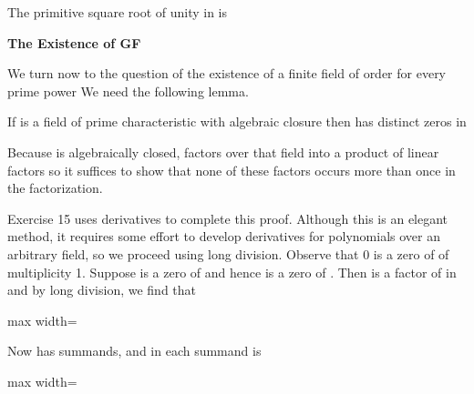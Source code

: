 \documentclass[11pt,oneside]{article}
\begin{document}
\begin{BookBody}
\noindent The primitive square root of unity in  is  \BookEnd{\blacktriangle}

\noindent \textbf{The Existence of GF}

\noindent We turn now to the question of the existence of a finite field of order  for every prime power  We need the following lemma.

 If  is a field of prime characteristic  with algebraic closure  then  has  distinct zeros in 

 Because  is algebraically closed,  factors over that field into a product of linear factors  so it suffices to show that none of these factors occurs more than once in the factorization.

Exercise 15 uses derivatives to complete this proof. Although this is an elegant method, it requires some effort to develop derivatives for polynomials over an arbitrary field, so we proceed using long division. Observe that 0 is a zero of  of multiplicity 1. Suppose  is a zero of  and hence is a zero of . Then  is a factor of  in  and by long division, we find that

\begin{center}\begin{adjustbox}{max width=\linewidth}\end{adjustbox}\end{center}

\noindent Now  has  summands, and in  each summand is

\begin{center}\begin{adjustbox}{max width=\linewidth}\end{adjustbox}\end{center}

\end{BookBody}
\end{document}
